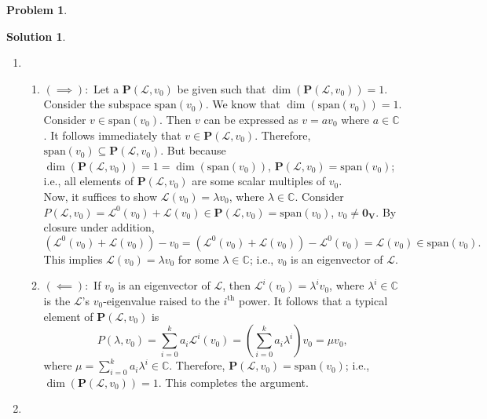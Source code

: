 \documentclass{article}
\theoremstyle{definition}
\newtheorem*{prob*}{Problem}
\newtheorem*{sln*}{Solution}
\newcommand{\V}{\mathbf{V}}
\newcommand{\xpan}{\text{span}}
\newcommand{\lag}{\mathcal{L}}
\begin{document}
\begin{prob*}
\begin{sln*}
\begin{enumerate}
			
			
			\item 
			\begin{enumerate}

			\item $(\implies):$ Let a $\mathbf{P}(\lag,v_0)$ be given such that $\dim(\mathbf{P}(\lag,v_0)) = 1$. Consider the subspace $\xpan(v_0)$. We know that $\dim(\xpan(v_0)) = 1$. Consider $v \in \xpan(v_0)$. Then $v$ can be expressed as $v = av_0$ where $a\in \mathbb{C}$. It follows immediately that $v\in \mathbf{P}(\lag,v_0)$. Therefore, $\xpan(v_0) \subseteq \mathbf{P}(\lag,v_0)$. But because $\dim(\mathbf{P}(\lag,v_0)) = 1 = \dim(\xpan(v_0))$, $\mathbf{P}(\lag,v_0) = \xpan(v_0)$; i.e., all elements of $\mathbf{P}(\lag,v_0)$ are some scalar multiples of $v_0$.\\
			
			Now, it suffices to show $\lag(v_0) = \lambda v_0$, where $\lambda \in \mathbb{C}$. Consider $P(\lag, v_0) = \lag^0(v_0) + \lag(v_0) \in \mathbf{P}(\lag,v_0) = \xpan(v_0)$, $v_0 \neq \mathbf{0}_\V$. By closure under addition, $$(\lag^0(v_0) + \lag(v_0)) - v_0 = (\lag^0(v_0) + \lag(v_0)) - \lag^0(v_0) = \lag(v_0) \in \xpan(v_0).$$ This implies $\lag(v_0) = \lambda v_0$ for some $\lambda \in \mathbb{C}$; i.e., $v_0$ is an eigenvector of $\lag$.\\
				
				
			\item $(\impliedby):$ If $v_0$ is an eigenvector of $\lag$, then $\lag^i(v_0) = \lambda^i v_0$, where $\lambda^i \in \mathbb{C}$ is the $\lag$'s $v_0$-eigenvalue raised to the $i^{\text{th}}$ power. It follows that a typical element of $\mathbf{P}(\lag,v_0)$ is $$P(\lambda,v_0) = \sum_{i=0}^k a_i \lag^i (v_0) =  \left(\sum_{i=0}^k a_i\lambda^i\right)  v_0 = \mu v_0,$$
			where $\mu = \sum_{i=0}^k a_i \lambda^i \in \mathbb{C}$. Therefore, $\mathbf{P}(\lag,v_0) = \xpan(v_0)$; i.e., $\dim\left(\mathbf{P}(\lag,v_0)\right) = 1$. This completes the argument. \\
			
			\end{enumerate}
		
		\item
		\begin{enumerate}
			

\end{enumerate}
\end{enumerate}
\end{sln*}
\end{prob*}
\end{document}
